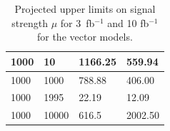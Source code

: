 \begin{table}[h!]
\begin{minipage}{.45\textwidth}
{\begin{tabular}{llll}
1000  &    10  &       1166.25  & 559.94 \\\hline
1000  &    1000  &    788.88  & 406.00 \\\hline
1000  &    1995  &    22.19  & 12.09 \\\hline
1000  &    10000  &   616.5  &   2002.50 \\\hline
\end{tabular}
\caption{Projected  upper limits on signal strength $\mu$ for 3~fb$^{-1}$ and 10 fb$^{-1}$ for the vector models.
\label{tab:dm_V_R_values}}
}\end{minipage}
\end{table}


